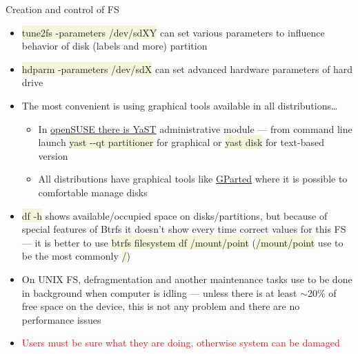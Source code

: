 \documentclass[compress, xelatex, 11pt, xcolor=svgnames, aspectratio=169,
	hyperref={
		bookmarks=true,
		unicode=true,
		colorlinks=true,
		pdftitle={Linux, command line and MetaCentrum},
		plainpages=false,
		pdfauthor={Vojtech Zeisek},
		pdfsubject={Course about use of Linux command line, writing shell scripts and using MetaCentrum of CESNET},
		pdfcreator={XeLaTeX},
		pdfkeywords={Linux, GNU, BASH, shell, command line, MetaCentrum},
		linkcolor=DarkRed, %
		anchorcolor=DarkBlue, %
		citecolor=Indigo, %
		filecolor=NavyBlue, %
		menucolor=DarkMagenta, %
		urlcolor=DarkBlue, %
		},
	url={hyphens, lowtilde} %
	]{beamer}
\renewcommand{\texttt}[1]{\colorbox{Beige}{{\ttfamily #1}}}
\renewcommand{\alert}[1]{\textcolor{red}{#1}}
\begin{document}
\begin{frame}[allowframebreaks]{Creation and control of FS}
\begin{itemize}
\begin{itemize}
		\end{itemize}
		\item \texttt{tune2fs -parameters /dev/sdXY} can set various parameters to influence behavior of disk (labels and more) partition
		\item \texttt{hdparm -parameters /dev/sdX} can set advanced hardware parameters of hard drive
		\item The most convenient is using graphical tools available in all distributions\ldots
		\begin{itemize}
			\item In \href{https://en.opensuse.org/Portal:YaST}{openSUSE there is YaST} administrative module --- from command line launch \texttt{yast -{-}qt partitioner} for graphical or \texttt{yast disk} for text-based version
			\item All distributions have graphical tools like \href{https://gparted.org/}{GParted} where it is possible to comfortable manage disks
		\end{itemize}
		\item \texttt{df -h} shows available/occupied space on disks/partitions, but because of special features of Btrfs it doesn't show every time correct values for this FS --- it is better to use \texttt{btrfs filesystem df /mount/point} (\texttt{/mount/point} use to be the most commonly \texttt{/})
		\item On UNIX FS, defragmentation and another maintenance tasks use to be done in background when computer is idling --- unless there is at least $\sim$20\% of free space on the device, this is not any problem and there are no performance issues
		\item \alert{Users must be sure what they are doing, otherwise system can be damaged}
	\end{itemize}
\end{frame}
\end{document}
